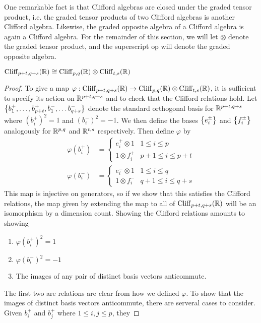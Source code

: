 One remarkable fact is that Clifford algebras are closed under the graded
tensor product, i.e. the graded tensor products of two Clifford algebras is
another Clifford algebra. Likewise, the graded opposite algebra of a Clifford
algebra is again a Clifford algebra. For the remainder of this section,
we will let $\otimes$ denote the graded tensor product, and the superscript
$\text{op}$ will denote the graded opposite algebra.
%
\begin{thm}
$\operatorname{Cliff}_{p+t,q+s}(\mathbb{R}) \cong \operatorname{Cliff}_{p,q}(\mathbb{R}) \otimes \operatorname{Cliff}_{t,s}(\mathbb{R})$
\end{thm}
%
\begin{proof}
To give a map $\varphi : \operatorname{Cliff}_{p+t,q+s}(\mathbb{R}) \to \operatorname{Cliff}_{p,q}(\mathbb{R}) \otimes
\operatorname{Cliff}_{t,s}(\mathbb{R})$, it is sufficient to specify its action on $\mathbb{R}^{p+t,q+s}$ and
to check that the Clifford relations hold. Let
$\left\lbrace b_1^+,\ldots, b_{p+t}^+, b_1^-, \ldots b_{q+s}^- \right\rbrace$ denote the standard
orthogonal basis for $\mathbb{R}^{p+t,q+s}$ where $(b_i^+)^2 = 1$ and $(b_i^-)^2 = -1$.
We then define the bases $\left\lbrace e_i^\pm \right\rbrace$ and $\left\lbrace f_i^\pm \right\rbrace$ analogously for
$\mathbb{R}^{p,q}$ and $\mathbb{R}^{t,s}$ respectively. Then define $\varphi$ by
%
\begin{align*}
\varphi(b_i^+)  & = \begin{cases}
e_i^+ \otimes 1 & 1 \leq i \leq p     \\
1 \otimes f_i^+ & p+1 \leq i \leq p+t
\end{cases} \\
\varphi(b_i^-)  & = \begin{cases}
e_i^- \otimes 1 & 1 \leq i \leq q     \\
1 \otimes f_i^- & q+1 \leq i \leq q+s
\end{cases}
\end{align*}
%
This map is injective on generators, so if we show that this satisfies the
Clifford relations, the map given by extending the map to all of
$\operatorname{Cliff}_{p+t,q+s}(\mathbb{R})$ will be an isomorphism by a dimension count. Showing
the Clifford relations amounts to showing
%
\begin{enumerate}
\item $\varphi(b_i^+)^2 = 1$
\item $\varphi(b_i^-)^2 = -1$
\item The images of any pair of distinct basis vectors anticommute.
\end{enumerate}
%
The first two are relations are clear from how we defined $\varphi$. To show
that the images of distinct basis vectors anticommute, there are serveral
cases to consider. Given $b_i^+$ and $b_j^+$ where $1 \leq i,j \leq p$, they

\end{proof}
